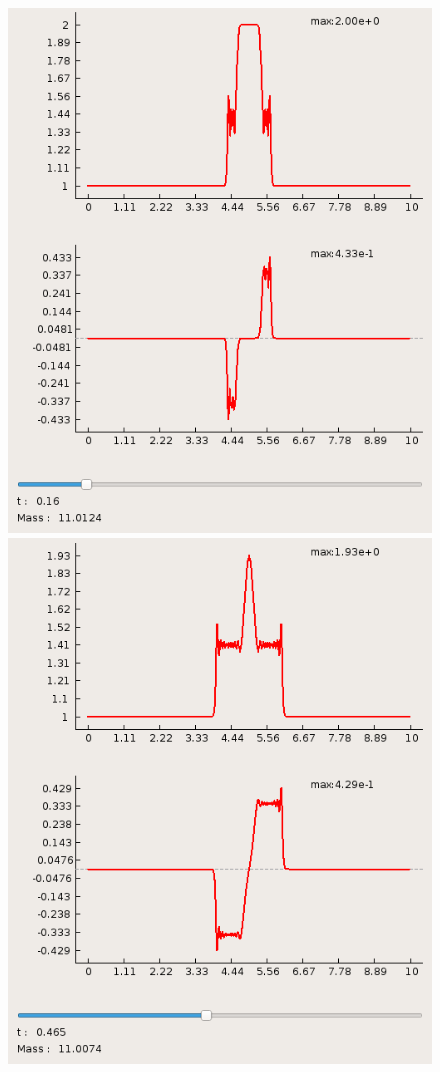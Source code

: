 \documentclass[a4paper, 11pt]{article}
\begin{document}
\begin{figure}[h]
\begin{minipage}[h] {0.49\linewidth}
		\includegraphics[width=1\linewidth]{p1/p1_t=0,16.png}
	\end{minipage}
	\begin{minipage}[h] {0.49\linewidth}
		\includegraphics[width=1\linewidth]{p1/p1_t=0,465.png}

\end{minipage}
\end{figure}
\end{document}
